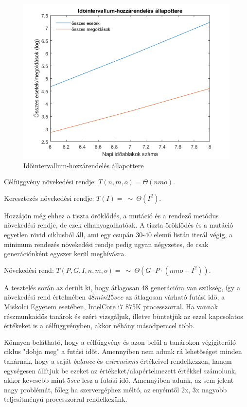 \documentclass[12pt,a4paper]{report}
\begin{document}
\begin{figure}
\includegraphics[width=\linewidth]{images/idointervallum.png}
\caption{Időintervallum-hozzárendelés állapottere}
\end{figure}

Célfüggvény növekedési rendje: $T(n,m,o)=\Theta(nmo)$.

Keresztezés növekedési rendje: $T(I)=\ \sim \ \Theta(I^2)$.

Hozzájön még ehhez a tiszta öröklődés, a mutáció és a rendező metódus növekedési rendje, de ezek elhanyagolhatóak. A tiszta öröklődés és a mutáció egyetlen rövid ciklusból áll, ami egy csupán 30-40 elemű listán iterál végig, a minimum rendezés növekedési rendje pedig ugyan négyzetes, de csak generációnként egyszer kerül meghívásra.

Növekedési rend: $T(P,G,I,n,m,o)=\ \sim \ \Theta(G \cdot P \cdot (nmo+I^2))$.

A tesztelés során az derült ki, hogy átlagosan 48 generációra van szükség, így a növekedési rend értelmében $48min 25sec$ az átlagosan várható futási idő, a Miskolci Egyetem esetében, IntelCore i7 875K processzorral. Ha vannak részmunkaidős tanárok és ezért vizsgáljuk, illetve büntetjük az ezzel kapcsolatos értékeket is a célfüggvényben, akkor néhány másodperccel több.

Könnyen belátható, hogy a célfüggvény és azon belül a tanárokon végigiteráló ciklus "dobja meg" a futási időt. Amennyiben nem adunk rá lehetőséget minden tanárnak, hogy a saját \textit{balance} és \textit{extremisms} értékeivel rendelkezzen, hanem egységesen állítjuk be ezeket az értékeket/alapértelmezett értékkel számolunk, akkor kevesebb mint $5 sec$ lesz a futási idő. Amennyiben adunk, az sem jelent nagy problémát, főleg ha szervergéphez méltó, az enyémtől 2x, 3x nagyobb teljesítményű processzorral rendelkezünk.
\end{document}

